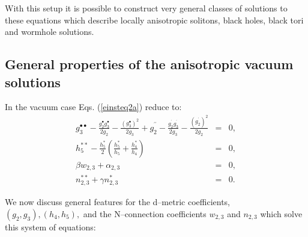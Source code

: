 \documentclass[a4paper,preprint,prabib,aps]{revtex4}
\begin{document}
With this setup it is possible to construct very general classes of
solutions to these equations \cite{vsbd,v} which describe locally
anisotropic solitons, black holes, black tori and wormhole solutions.

\subsection{General properties of the anisotropic vacuum solutions}

In the vacuum case Eqs. (\ref{einsteq2a}) reduce to:
\begin{eqnarray}
g_3^{\bullet \bullet }-\frac{g_2^{\bullet }g_3^{\bullet }}{2g_2}-\frac{
(g_3^{\bullet })^2}{2g_3}+g_2^{^{\prime \prime }}-\frac{g_2^{^{\prime
}}g_3^{^{\prime }}}{2g_3}-\frac{(g_2^{^{\prime }})^2}{2g_2} &=&0,
\label{einsteq3a} \\
h_5^{**}-\frac{h_5^{*}}{2}\left( \frac{h_5^{*} }{h_5}+\frac{h_4^{*}}{h_4}
\right) &=&0,  \label{einsteq3b} \\
\beta w_{2,3}+\alpha _{2,3} &=&0,  \label{einsteq3c} \\
n_{2,3}^{**}+\gamma n_{2,3}^{*} &=&0.  \label{einsteq3d}
\end{eqnarray}

We now discuss general features for the d--metric coefficients, $\left(
g_2,g_3\right) ,\left( h_4,h_5\right) ,$ and the N--connection coefficients
$w_{2,3}$ and $n_{2,3}$ which solve this system of equations:
\end{document}
